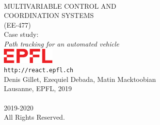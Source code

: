 \pagestyle{empty}
{\ \vspace{50px}\\ \centering \huge{MULTIVARIABLE CONTROL AND\\ COORDINATION SYSTEMS\\ (EE-477)}\\}
{\centering \vspace{20px}\large{Case study:\\}\Large{\emph{Path tracking for an automated vehicle}}\\ \vspace{250px}}
%
\large{\centering
\noindent\includegraphics[width = 100px]{./_imags/EPFL-Logo}\\
%
\vspace{20px}
\noindent\texttt{http://react.epfl.ch}\\
%
\vspace{20px}
\noindent Denis Gillet, Ezequiel Debada, Matin Macktoobian\\
%
\noindent Lausanne, EPFL, 2019\\
}\newpage
%
{\centering\ \ \\ \vspace{550px} \raisebox{1px}{\textcopyright} 2019-2020
 \\ 
%
\noindent All Rights Reserved.\\}